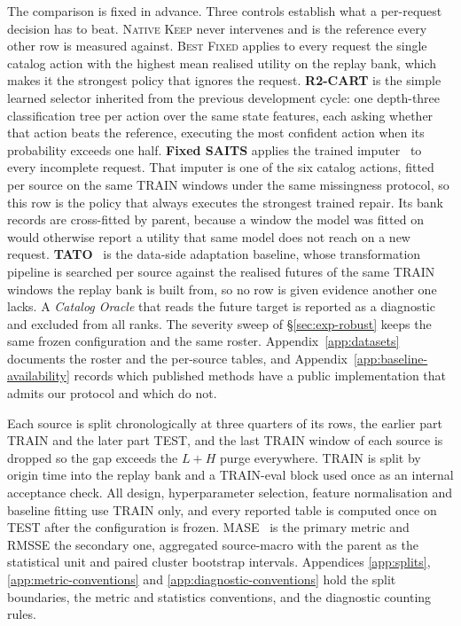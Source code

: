 \documentclass{article}
\begin{document}
The comparison is fixed in advance. Three controls establish what a per-request decision has to
beat. \textsc{Native Keep} never intervenes and is the reference every other row is measured
against. \textsc{Best Fixed} applies to every request the single catalog action with the
highest mean realised utility on the replay bank, which makes it the strongest policy that
ignores the request. \textbf{R2-CART} is the simple learned selector inherited from the
previous development cycle: one depth-three classification tree per action over the same state
features, each asking whether that action beats the reference, executing the most confident
action when its probability exceeds one half. \textbf{Fixed SAITS} applies the trained
imputer~\citep{du2023saits,du2023pypots} to every incomplete request. That imputer is one of
the six catalog actions, fitted per source on the same TRAIN windows under the same missingness
protocol, so this row is the policy that always executes the strongest trained repair. Its bank
records are cross-fitted by parent, because a window the model was fitted on would otherwise
report a utility that same model does not reach on a new request.
\textbf{TATO}~\citep{qiu2026tato} is the data-side adaptation baseline, whose
transformation pipeline is searched per source against the realised futures of the same TRAIN
windows the replay bank is built from, so no row is given evidence another one lacks. A
\emph{Catalog Oracle} that reads the future target is reported as a diagnostic and excluded
from all ranks.
The severity sweep of \S\ref{sec:exp-robust} keeps the same frozen configuration and the same
roster. Appendix~\ref{app:datasets} documents the roster and the per-source tables, and
Appendix~\ref{app:baseline-availability} records which published methods have a public
implementation that admits our protocol and which do not.

Each source is split chronologically at three quarters of its rows, the earlier part TRAIN and
the later part TEST, and the last TRAIN window of each source is dropped so the gap exceeds the
$L + H$ purge everywhere. TRAIN is split by origin time into the replay bank and a TRAIN-eval
block used once as an internal acceptance check. All design, hyperparameter selection, feature
normalisation and baseline fitting use TRAIN only, and every reported table is computed once on
TEST after the configuration is frozen. MASE~\citep{hyndman2006mase} is the primary metric and
RMSSE the secondary one, aggregated source-macro with the parent as the statistical unit and
paired cluster bootstrap intervals. Appendices \ref{app:splits},
\ref{app:metric-conventions} and \ref{app:diagnostic-conventions} hold the split boundaries,
the metric and statistics conventions, and the diagnostic counting rules.
\end{document}
